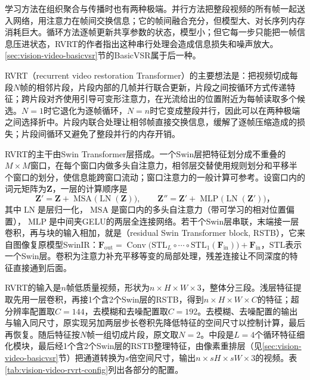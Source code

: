 学习方法在组织聚合与传播时也有两种极端。并行方法把整段视频的所有帧一起送入网络，用注意力在帧间交换信息；它的帧间融合充分，但模型大、对长序列内存消耗巨大。循环方法逐帧更新共享参数的状态，模型小；但它每一步只能把一帧信息压进状态，RVRT的作者指出这种串行处理会造成信息损失和噪声放大。\ref{sec:vision-video-basicvsr}节的BasicVSR属于后一种。

RVRT（recurrent video restoration Transformer）的主要想法是：把视频切成每段$N$帧的相邻片段，片段内部的几帧并行联合更新，片段之间按循环方式传递特征；跨片段对齐使用引导可变形注意力，在光流给出的位置附近为每帧读取多个候选。$N=1$时它退化为逐帧循环，$N=n$时它变成整段并行，因此可以在两种极端之间选择折中。片段内联合处理让相邻帧直接交换信息，缓解了逐帧压缩造成的损失；片段间循环又避免了整段并行的内存开销。

RVRT的主干由Swin Transformer层搭成。一个Swin层把特征划分成不重叠的$M\times M$窗口，在每个窗口内做多头自注意力，相邻层交替使用规则划分和平移半个窗口的划分，使信息能跨窗口流动；窗口注意力的一般计算可参考。设窗口内的词元矩阵为$\bm{Z}$，一层的计算顺序是
\begin{equation}
  \bm{Z}'=\bm{Z}+\operatorname{MSA}\bigl(\operatorname{LN}(\bm{Z})\bigr),\qquad
  \bm{Z}''=\bm{Z}'+\operatorname{MLP}\bigl(\operatorname{LN}(\bm{Z}')\bigr)\text{，}
  \label{eq:vision-video-swin-layer}
\end{equation}
其中$\operatorname{LN}$是层归一化，$\operatorname{MSA}$是窗口内的多头自注意力（带可学习的相对位置偏置），$\operatorname{MLP}$是中间夹GELU的两层全连接网络。若干个Swin层串联，末端接一层卷积，再与块的输入相加，就是（residual Swin Transformer block, RSTB），它来自图像复原模型SwinIR：$\bm{F}_{\mathrm{out}}=\operatorname{Conv}\bigl(\mathrm{STL}_L\circ\cdots\circ\mathrm{STL}_1(\bm{F}_{\mathrm{in}})\bigr)+\bm{F}_{\mathrm{in}}$，$\mathrm{STL}$表示一个Swin层。卷积为注意力补充平移等变的局部处理，残差连接让不同深度的特征直接通到后面。

RVRT的输入是$n$帧低质量视频，形状为$n\times H\times W\times3$，整体分三段。浅层特征提取先用一层卷积，再接1个含2个Swin层的RSTB，得到$n\times H\times W\times C$的特征；超分辨率配置取$C=144$，去模糊和去噪配置取$C=192$。去模糊、去噪配置的输出与输入同尺寸，原实现另加两层步长卷积先降低特征的空间尺寸以控制计算，最后再恢复。随后特征按$N$帧一组切成片段，原文取$N=2$。中段是$L=4$个循环特征细化模块，最后经1个含2个Swin层的RSTB整理特征，由像素重排层（见\ref{sec:vision-video-basicvsr}节）把通道转换为$s$倍空间尺寸，输出$n\times sH\times sW\times3$的视频。表\ref{tab:vision-video-rvrt-config}列出各部分的配置。

